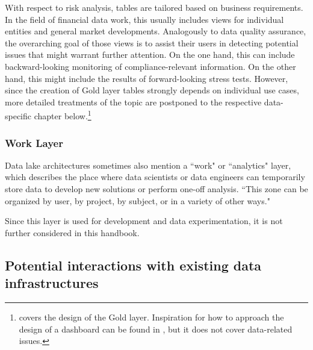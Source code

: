 \documentclass[a4paper, 11pt]{report}
\begin{document}
With respect to risk analysis, tables are tailored based on business requirements. In the field of financial data work, this usually includes views for individual entities and general market developments. Analogously to data quality assurance, the overarching goal of those views is to assist their users in detecting potential issues that might warrant further attention. On the one hand, this can include backward-looking monitoring of compliance-relevant information. On the other hand, this might include the results of forward-looking stress tests. However, since the creation of Gold layer tables strongly depends on individual use cases, more detailed treatments of the topic are postponed to the respective data-specific chapter below.\footnote{\textcite[Chapter 7]{Strengholt.2025} covers the design of the Gold layer. Inspiration for how to approach the design of a dashboard can be found in \textcite{Wexler.2017}, but it does not cover data-related issues.}

\subsubsection{Work Layer}

Data lake architectures sometimes also mention a ``work" or ``analytics" layer, which describes the place where data scientists or data engineers can temporarily store data to develop new solutions or perform one-off analysis. ``This zone can be organized by user, by project, by subject, or in a variety of other ways." \parencite{Gorelik.2019}

Since this layer is used for development and data experimentation, it is not further considered in this handbook.

\subsection{Potential interactions with existing data infrastructures}
\end{document}
